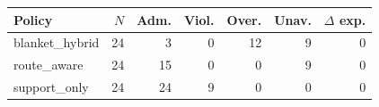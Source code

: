 \begingroup\scriptsize
\setlength{\tabcolsep}{3pt}
\begin{tabular}{@{}lrrrrrr@{}}
\hline
Policy & $N$ & Adm. & Viol. & Over. & Unav. & $\Delta$ exp. \\
\hline
blanket\_hybrid & 24 & 3 & 0 & 12 & 9 & 0 \\
route\_aware & 24 & 15 & 0 & 0 & 9 & 0 \\
support\_only & 24 & 24 & 9 & 0 & 0 & 0 \\
\hline
\end{tabular}
\endgroup
